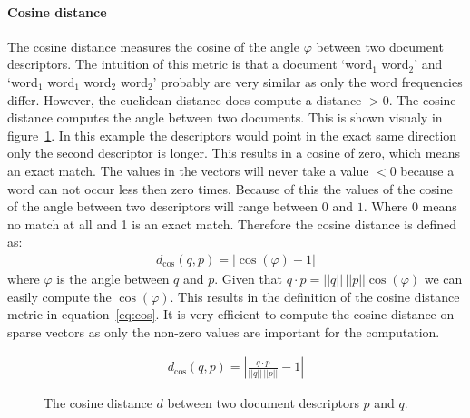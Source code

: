 \paragraph{Cosine distance} The cosine distance measures the cosine of the
angle $\varphi$ between two document descriptors. The intuition of this metric
is that a document `word$_1$ word$_2$' and `word$_1$ word$_1$ word$_2$
word$_2$' probably are very similar as only the word frequencies differ.
However, the euclidean distance does compute a distance $> 0$. The cosine
distance computes the angle between two documents. This is shown visualy in
figure~\ref{fig:cosine}. In this example the descriptors would point in the
exact same direction only the second descriptor is longer.  This results in a
cosine of zero, which means an exact match. The values in the vectors will
never take a value $< 0$ because a word can not occur less then zero times.
Because of this the values of the cosine of the angle between two descriptors
will range between $0$ and $1$. Where 0 means no match at all and 1 is an exact
match. Therefore the cosine distance is defined as:
\begin{align*}
  d_\textrm{cos}(q,p) = |\cos(\varphi) - 1|
\end{align*}
where $\varphi$ is the angle between $q$ and $p$. Given that $q \cdot p = ||q||
\,||p|| \cos(\varphi)$ we can easily compute the $\cos(\varphi)$. This results
in the definition of the cosine distance metric in equation~\ref{eq:cos}. It is
very efficient to compute the cosine distance on sparse vectors as only the
non-zero values are important for the computation.

\begin{align}
  d_\textrm{cos}(q,p) = \left| \frac{q \cdot p}{||q||\,||p||} - 1\right| \label{eq:cos}
\end{align}

\begin{figure}[h!]
 \center

 \caption{The cosine distance $d$ between two document descriptors $p$ and $q$.}
 \label{fig:cosine}
\end{figure}

